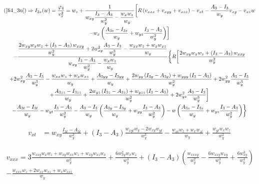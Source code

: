 \documentclass[12pt,a4paper]{article}
\begin{document}
	\begin{multline}
	  (\ref{fi4_3u}) \Rightarrow I_{2x}(w) = \frac{\varphi_4}{v_x^2} = w_z + \genfrac{}{}{}{0}{1}{w_{xy} \genfrac{}{}{}{0}{I_3 - A_3}{w_y^2} - \genfrac{}{}{}{0}{w_x w_z}{w_y}} \biggl[ R \left(v_{xxx} + v_{xyy} + v_{xzz} \right)
	  - v_{xt}
	  - \frac{A_3 - I_3}{w_y} v_{xy}
	  - v_{xz} w \\
	  - w_x \left( \frac{A_{3z} - I_{3z}}{w_y} + w_{yz} \frac{I_3 - A_3}{w_y^2} \right) \biggr] \\
      - \genfrac{}{}{}{0}{\genfrac{}{}{}{0}{2 w_{xy} w_x w_z + \left( I_3 - A_3 \right) w_{xxy}}{w_y^2} + 2 w_{xy}^2 \genfrac{}{}{}{0}{A_3 - I_3}{w_y^3} - \genfrac{}{}{}{0}{w_{xx} w_z + w_x w_{xz}}{w_y}}{w_{xy} \genfrac{}{}{}{0}{I_3 - A_3}{w_y^2} - \genfrac{}{}{}{0}{w_x w_z}{w_y}} \biggl\{ R \biggl[\frac{2 w_{xy} w_x w_z + \left( I_3 - A_3 \right) w_{xxy}}{w_y^2} \\
	  + 2 w_{xy}^2 \frac{A_3 - I_3}{w_y^3} - \frac{w_{xx} w_z + w_x w_{xz}}{w_y}
	  + \frac{A_{3yy} - I_{3yy}}{w_y} + \frac{2 w_{yy} \left( I_{3y} - A_{3y} \right) + w_{yyy} \left( I_3 - A_3 \right)}{w_y^2} + 2 w_{yy}^2 \frac{A_3 - I_3}{w_y^3} \\
	  + \frac{A_{3zz} - I_{3zz}}{w_y} + \frac{2 w_{yz} \left( I_{3z} - A_{3z} \right) + w_{yzz} \left( I_3 - A_3 \right)}{w_y^2} + 2 w_{yz}^2 \frac{A_3 - I_3}{w_y^3} \biggr] \\
	  - \frac{A_{3t} - I_{3t}}{w_y} - w_{yt} \frac{I_3 - A_3}{w_y^2}
	  - \frac{A_3 - I_3}{w_y} \left( \frac{A_{3y} - I_{3y}}{w_y} + w_{yy} \frac{I_3 - A_3}{w_y^2} \right)
	  - w \left( \frac{A_{3z} - I_{3z}}{w_y} + w_{yz} \frac{I_3 - A_3}{w_y^2} \right) \biggr\}
	\end{multline}

  \begin{align}
	v_{xt} &= w_{xy} \frac{I_{3t} - A_{3t}}{w_y^2} + \left( I_3 - A_3 \right) \frac{w_{xyt} w_y - 2 w_{xy} w_{yt}}{w_y^3} - \frac{w_{xt} w_z + w_x w_{zt}}{w_y} + \frac{w_{yt} w_x w_z}{w_y^2}
  \end{align}

  \begin{multline}
    v_{xxx} = 3 \frac{w_{xxy} w_x w_z + w_{xy} w_{xx} w_z + w_{xy} w_{xz} w_x}{w_y^2} + \frac{6 w_{xy}^2 w_x w_z}{w_y^3}
	  + \left( I_3 - A_3 \right) \left( \frac{w_{xxxy}}{w_y^2} - \frac{6 w_{xxy} w_{xy}}{w_y^3} + \frac{6 w_{xy}^3}{w_y^4} \right) \\
	  - \frac{w_{xxx} w_z + 2 w_{xx} w_{xz} + w_x w_{xxz}}{w_y}
  \end{multline}
\end{document}
